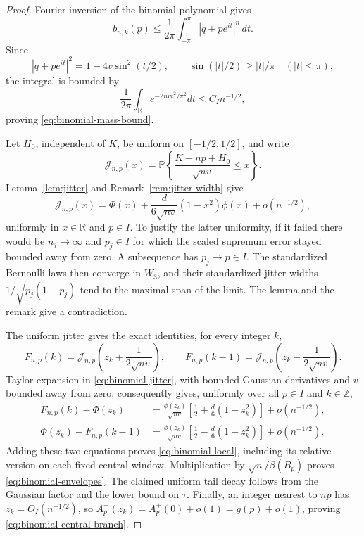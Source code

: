 \documentclass[aop]{imsart}
\theoremstyle{plain}
\theoremstyle{definition}
\theoremstyle{definition}
\newcommand{\PP}{\mathbb P}
\newcommand{\R}{\mathbb R}
\begin{document}
\begin{proof}
Fourier inversion of the binomial polynomial gives
\[
 b_{n,k}(p)\le\frac1{2\pi}\int_{-\pi}^{\pi}|q+pe^{it}|^n\,dt.
\]
Since
\[
 |q+pe^{it}|^2=1-4v\sin^2(t/2),\qquad
 \sin(|t|/2)\ge |t|/\pi\quad (|t|\le\pi),
\]
the integral is bounded by
\[
 \frac1{2\pi}\int_{\R}e^{-2nvt^2/\pi^2}dt
 \le C_I n^{-1/2},
\]
proving \eqref{eq:binomial-mass-bound}.

Let \(H_0\), independent of \(K\), be uniform on \([-1/2,1/2]\), and
write
\[
 \mathcal J_{n,p}(x)=
 \PP\left\{\frac{K-np+H_0}{\sqrt{nv}}\le x\right\}.
\]
Lemma~\ref{lem:jitter} and Remark~\ref{rem:jitter-width} give
\begin{equation}\label{eq:binomial-jitter}
 \mathcal J_{n,p}(x)
 =\Phi(x)+\frac{d}{6\sqrt{nv}}(1-x^2)\phi(x)
   +o(n^{-1/2}),
\end{equation}
uniformly in \(x\in\R\) and \(p\in I\).  To justify the latter
uniformity, if it failed there would be \(n_j\to\infty\) and
\(p_j\in I\) for which the scaled supremum error stayed bounded away
from zero.  A subsequence has \(p_j\to p\in I\).  The standardized
Bernoulli laws then converge in \(W_3\), and their standardized jitter
widths \(1/\sqrt{p_j(1-p_j)}\) tend to the maximal span of the limit.
The lemma and the remark give a contradiction.

The uniform jitter gives the exact identities, for every integer \(k\),
\[
 F_{n,p}(k)=\mathcal J_{n,p}
       \left(z_k+\frac1{2\sqrt{nv}}\right),\qquad
 F_{n,p}(k-1)=\mathcal J_{n,p}
       \left(z_k-\frac1{2\sqrt{nv}}\right).
\]
Taylor expansion in \eqref{eq:binomial-jitter}, with bounded Gaussian
derivatives and \(v\) bounded away from zero, consequently gives,
uniformly over all \(p\in I\) and \(k\in\mathbb Z\),
\[
 \begin{split}
 F_{n,p}(k)-\Phi(z_k)
 &=\frac{\phi(z_k)}{\sqrt{nv}}
       \left[\frac12+\frac d6(1-z_k^2)\right]+o(n^{-1/2}),\\
 \Phi(z_k)-F_{n,p}(k-1)
 &=\frac{\phi(z_k)}{\sqrt{nv}}
       \left[\frac12-\frac d6(1-z_k^2)\right]+o(n^{-1/2}).
 \end{split}
\]
Adding these two equations proves \eqref{eq:binomial-local}, including
its relative version on each fixed central window.  Multiplication
by \(\sqrt n/\beta(B_p)\) proves
\eqref{eq:binomial-envelopes}.  The claimed uniform tail decay follows
from the Gaussian factor and the lower bound on \(\tau\).  Finally, an
integer nearest to \(np\) has \(z_k=O_I(n^{-1/2})\), so
\(A_p^+(z_k)=A_p^+(0)+o(1)=g(p)+o(1)\), proving
\eqref{eq:binomial-central-branch}.
\end{proof}
\end{document}
